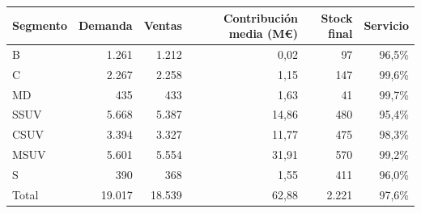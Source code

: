 \begin{tabular}{lrrrrr}
\toprule
Segmento & Demanda & Ventas & Contribución media (M€) & Stock final & Servicio \\
\midrule
B & 1.261 & 1.212 & 0,02 & 97 & 96,5\% \\
C & 2.267 & 2.258 & 1,15 & 147 & 99,6\% \\
MD & 435 & 433 & 1,63 & 41 & 99,7\% \\
SSUV & 5.668 & 5.387 & 14,86 & 480 & 95,4\% \\
CSUV & 3.394 & 3.327 & 11,77 & 475 & 98,3\% \\
MSUV & 5.601 & 5.554 & 31,91 & 570 & 99,2\% \\
S & 390 & 368 & 1,55 & 411 & 96,0\% \\
Total & 19.017 & 18.539 & 62,88 & 2.221 & 97,6\% \\
\bottomrule
\end{tabular}
